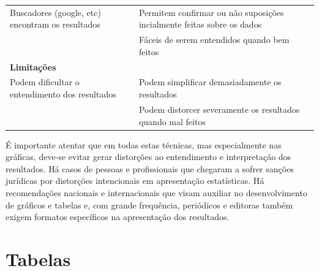 \documentclass[
]{book}
\begin{document}
\begin{longtable}[]{@{}ll@{}}
\begin{minipage}[t]{0.47\columnwidth}
Buscadores (google, etc) encontram os resultados\strut
\end{minipage} & \begin{minipage}[t]{0.47\columnwidth}\raggedright
Permitem confirmar ou não suposições incialmente feitas sobre os dados\strut
\end{minipage}\tabularnewline
\begin{minipage}[t]{0.47\columnwidth}\raggedright
\strut
\end{minipage} & \begin{minipage}[t]{0.47\columnwidth}\raggedright
Fáceis de serem entendidos quando bem feitos\strut
\end{minipage}\tabularnewline
\begin{minipage}[t]{0.47\columnwidth}\raggedright
\textbf{Limitações}\strut
\end{minipage} & \begin{minipage}[t]{0.47\columnwidth}\raggedright
\strut
\end{minipage}\tabularnewline
\begin{minipage}[t]{0.47\columnwidth}\raggedright
Podem dificultar o entendimento dos resultados\strut
\end{minipage} & \begin{minipage}[t]{0.47\columnwidth}\raggedright
Podem simplificar demasiadamente os resultados\strut
\end{minipage}\tabularnewline
\begin{minipage}[t]{0.47\columnwidth}\raggedright
\strut
\end{minipage} & \begin{minipage}[t]{0.47\columnwidth}\raggedright
Podem distorcer severamente os resultados quando mal feitos\strut
\end{minipage}\tabularnewline
\bottomrule
\end{longtable}

É importante atentar que em todas estas técnicas, mas especialmente nas gráficas, deve-se evitar gerar distorções ao entendimento e interpretação dos resultados. Há casos de pessoas e profissionais que chegaram a sofrer sanções jurídicas por distorções intencionais em apresentação estatísticas. Há recomendações nacionais e internacionais que visam auxiliar no desenvolvimento de gráficos e tabelas e, com grande frequência, periódicos e editoras também exigem formatos específicos na apresentação dos resultados.

\hypertarget{tabelas}{%
\section{Tabelas}\label{tabelas}}
\end{document}
